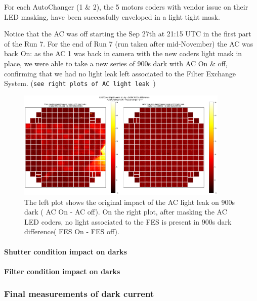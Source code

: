 For each AutoChanger (1 \& 2), the 5 motors coders with vendor issue on
their LED masking, have been successfully enveloped in a light tight
mask.

Notice that the AC was off starting the Sep 27th at 21:15 UTC in the
first part of the Run 7. For the end of Run 7 (run taken after
mid-November) the AC was back On: as the AC 1 was back in camera with
the new coders light mask in place, we were able to take a new series of
900s dark with AC On \& off, confirming that we had no light leak left
associated to the Filter Exchange System.
(\texttt{see\ right\ plots\ of\ AC\ light\ leak\ })

\begin{figure}
\begin{centering}
\includegraphics[width=0.9\textwidth]{sections/figures/AC_LightLeak_study.png}
\caption{ The left plot shows the original impact of the AC light leak on 900s dark ( AC On - AC off). On the right plot, after masking the AC LED coders, no light associated to the FES is present in 900s dark difference( FES On - FES off).  \label{fig-ac-light-leak}}
\end{centering}
\end{figure}

\paragraph{Shutter condition impact on
darks}\label{shutter-condition-impact-on-darks}

\paragraph{Filter condition impact on
darks}\label{filter-condition-impact-on-darks}

\subsubsection{Final measurements of dark
current}\label{final-measurements-of-dark-current}

